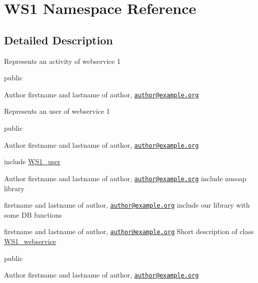 \hypertarget{namespace_w_s1}{\section{W\+S1 Namespace Reference}
\label{namespace_w_s1}
}


\subsection{Detailed Description}
Represents an activity of webservice 1

public \begin{DoxyAuthor}{Author}
firstname and lastname of author, \href{mailto:author@example.org}{\tt author@example.\+org}
\end{DoxyAuthor}
Represents an user of webservice 1

public \begin{DoxyAuthor}{Author}
firstname and lastname of author, \href{mailto:author@example.org}{\tt author@example.\+org}
\end{DoxyAuthor}
include \hyperlink{class_w_s1__user}{W\+S1\+\_\+user}

\begin{DoxyAuthor}{Author}
firstname and lastname of author, \href{mailto:author@example.org}{\tt author@example.\+org} include nusoap library

firstname and lastname of author, \href{mailto:author@example.org}{\tt author@example.\+org} include our library with some D\+B functions

firstname and lastname of author, \href{mailto:author@example.org}{\tt author@example.\+org} Short description of class \hyperlink{class_w_s1__webservice}{W\+S1\+\_\+webservice}
\end{DoxyAuthor}
public \begin{DoxyAuthor}{Author}
firstname and lastname of author, \href{mailto:author@example.org}{\tt author@example.\+org} 
\end{DoxyAuthor}
